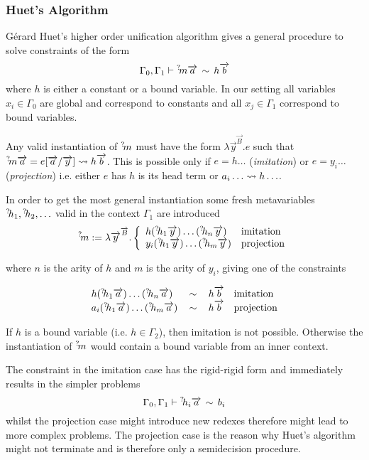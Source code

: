 \subsubsection{Huet's Algorithm}
Gérard Huet's higher order unification algorithm gives a general procedure to
solve constraints of the form
$$
    \Gamma_0, \Gamma_1
    \vdash
    {{}^? \kern-0.2em m} {\overrightarrow {a}} \,\sim\, h {\overrightarrow {b}}
$$
where $h$ is either a constant or a bound variable. In our setting all variables
$x_i \in \Gamma_0$ are global and correspond to constants and all $x_j
\in \Gamma_1$ correspond to bound variables.

Any valid instantiation of ${{}^? \kern-0.2em m}$ must have the form $\lambda \vec y^{\vec
B}. e$ such that ${{}^? \kern-0.2em m} {\overrightarrow {a}} = e[{\overrightarrow {a}}/{\overrightarrow {y}}] \leadsto h {\overrightarrow {b}}$. This is
possible only if $e = h \ldots$ (\emph{imitation}) or $e = y_i \ldots$
(\emph{projection}) i.e. either $e$ has $h$ is its head term or $a_i \ldots
\leadsto h \ldots$.

In order to get the most general instantiation some fresh metavariables ${{}^? \kern-0.2em h}_1, {{}^? \kern-0.2em h}_2, \ldots$ valid in the context $\Gamma_1$ are introduced
$$
    {{}^? \kern-0.2em m}
    := \lambda {\overrightarrow {y}}^{{\overrightarrow {B}}}.
    \left\{ \begin{array}{lllll} 
        h ({{}^? \kern-0.2em h}_1 {\overrightarrow {y}}) \ldots ({{}^? \kern-0.2em h}_n {\overrightarrow {y}})
        & \text{imitation}
        \\
        y_i ({{}^? \kern-0.2em h}_1 {\overrightarrow {y}}) \ldots ({{}^? \kern-0.2em h}_m {\overrightarrow {y}})
        & \text{projection}
     \end{array} \right.
$$

where $n$ is the arity of $h$ and $m$ is the arity of $y_i$,
giving one of the constraints

$$
\begin{array}{lllll} 
    h ({{}^? \kern-0.2em h}_1 {\overrightarrow {a}}) \ldots ({{}^? \kern-0.2em h}_n {\overrightarrow {a}})
    &\,\sim\,&
    h {\overrightarrow {b}}
    & \text{imitation}
    \\
    a_i ({{}^? \kern-0.2em h}_1 {\overrightarrow {a}}) \ldots ({{}^? \kern-0.2em h}_m {\overrightarrow {a}})
    &\,\sim\,&
    h {\overrightarrow {b}}
    & \text{projection}
 \end{array}
$$

If $h$ is a bound variable (i.e. $h\in \Gamma_2$), then imitation is not
possible. Otherwise the instantiation of ${{}^? \kern-0.2em m}$ would contain a bound
variable from an inner context.

The constraint in the imitation case has the rigid-rigid form and immediately
results in the simpler problems
$$
    \Gamma_0, \Gamma_1 \vdash {{}^? \kern-0.2em h}_i {\overrightarrow {a}} \,\sim\, b_i
$$
whilst the projection case might introduce new redexes therefore might lead to
more complex problems. The projection case is the reason why Huet's algorithm
might not terminate and is therefore only a semidecision procedure.

